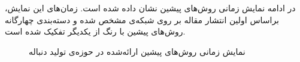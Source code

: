 \newline
در ادامه نمایش زمانی روش‌های پیشین نشان داده شده است. زمان‌های این نمایش، براساس اولین انتشار مقاله بر روی شبکه‌ی
مشخص شده و دسته‌بندی چهارگانه روش‌های پیشین با رنگ از یکدیگر تفکیک شده است.
\newline\newline
\begin{figure}[!htb]

\caption{نمایش زمانی روش‌های پیشین ارائه‌شده در حوزه‌ی تولید دنباله} 
\label{fig:chap2:timeline}
\end{figure}
